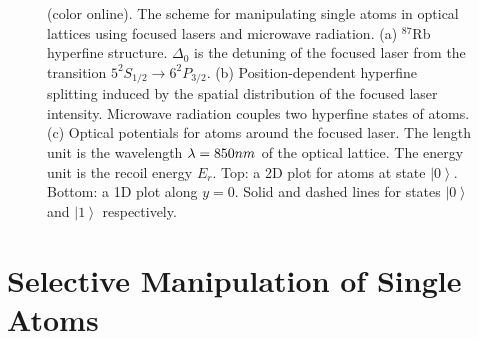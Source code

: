 \documentclass[pra,aps,showpacs,twocolumn]{revtex4}
\begin{document}
\begin{figure}[t]
\begin{center}
\end{center}
\par
\vspace*{-0.0cm}
\caption{(color online). The scheme for manipulating single atoms in optical
lattices using focused lasers and microwave radiation. (a) $^{87}$Rb
hyperfine structure. $\Delta _{0}$ is the detuning of the focused laser from
the transition $5^{2}S_{1/2}\rightarrow 6^{2}P_{3/2}$. (b)
Position-dependent hyperfine splitting induced by the spatial distribution
of the focused laser intensity. Microwave radiation couples two hyperfine
states of atoms. (c) Optical potentials for atoms around the focused laser.
The length unit is the wavelength $\protect\lambda =850nm$ of the optical
lattice. The energy unit is the recoil energy $E_{r}$. Top: a 2D plot for
atoms at state $\left\vert 0\right\rangle $. Bottom: a 1D plot along $y=0$.
Solid and dashed lines for states $\left\vert 0\right\rangle $ and $%
\left\vert 1\right\rangle $ respectively.}
\label{rr}
\end{figure}

\section{Selective Manipulation of Single Atoms}
\end{document}
